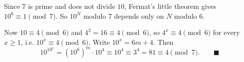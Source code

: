 Since $7$ is prime and does not divide $10$, Fermat's little theorem gives $10^6\equiv1\pmod 7$. So $10^N$ modulo $7$ depends only on $N$ modulo $6$.

Now $10\equiv4\pmod6$ and $4^2=16\equiv4\pmod 6$, so $4^x\equiv4\pmod6$ for every $x\ge1$, i.e. $10^x\equiv4\pmod 6$. Write $10^x=6m+4$. Then
\[10^{10^x}=\left(10^6\right)^m\cdot10^4\equiv10^4\equiv3^4=81\equiv4\pmod7. \qquad\blacksquare\]
